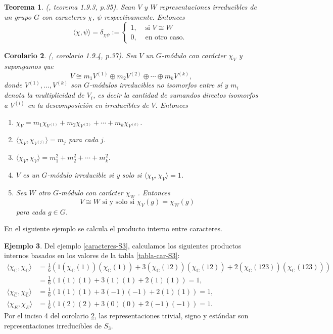 \documentclass[12pt]{book}
\newtheorem{theorem}{Teorema}[section]
\newtheorem{corollary}[theorem]{Corolario}
\theoremstyle{definition}
\newtheorem{example}[theorem]{Ejemplo}
\newcounter{in}
\begin{document}
\begin{theorem}{\normalfont (\cite{sagan2001symmetric}, teorema 1.9.3, p.35)}.
  \label{prod-car-irr}
  Sean $V$ y $W$ representaciones irreducibles de un grupo $G$ con
  caracteres $\chi$, $\psi$ respectivamente. Entonces
  \[
  \langle\chi,\psi\rangle=\delta_{\chi\psi}:=
  \begin{cases}
    1, & \text{ si }  V\cong W \\
    0, & \text{ en otro caso. } 
  \end{cases}
  \]
\end{theorem}
\begin{corollary}{\normalfont (\cite{sagan2001symmetric}, corolario 1.9.4, p.37)}.
  \label{multiplicidad}
  Sea $V$ un $G$-módulo con carácter $\chi_{V}$ y supongamos que 
  \begin{equation*}
    V\cong m_{1}V^{(1)}\oplus m_{2}V^{(2)}\oplus\cdots\oplus
    m_{k}V^{(k)},
  \end{equation*}
donde $V^{(1)},\ldots,V^{(k)}$ son $G$-módulos
irreducibles no isomorfos entre sí y $m_{i}$ denota la multiplicidad
de $V_{i}$, es
decir la cantidad de sumandos directos isomorfos a
$V^{(i)}$ en la descomposición en irreducibles de $V$. Entonces
\begin{enumerate}
\item $\chi_{V}=m_{1}\chi_{V^{(1)}}+m_{2}\chi_{V^{(2)}}+\cdots+m_{k}\chi_{V^{(k)}}$.
\item $\langle\chi_{V},\chi_{V^{(j)}}\rangle=m_{j}$ para cada $j$.
\item $\langle\chi_{V},\chi_{V}\rangle=m_{1}^{2}+m_{2}^{2}+\cdots+m_{k}^{2}$.
\item $V$ es un $G$-módulo irreducible si y solo si $\langle\chi_{V},\chi_{V}\rangle=1$.
\item Sea $W$ otro $G$-módulo con carácter $\chi_{W}$ . Entonces 
  $$V\cong W \mbox{ si y solo si } \chi_{V}(g)=\chi_{W}(g)$$
  para cada $g\in G$.
\end{enumerate}
\end{corollary}

En el siguiente ejemplo se calcula el producto interno entre caracteres.
\begin{example}
  \label{rep-triv-sig-est}
  Del ejemplo \ref{caracteres-S3}, calculamos los siguientes
  productos internos basados en los valores de la tabla \ref{tabla-car-S3}:
  \begin{align*}
    \langle\chi_{\mathbb{C}},\chi_{\mathbb{C}}\rangle&=\frac{1}{6}(1(\chi_{\mathbb{C}}(1))(\chi_{\mathbb{C}}(1))+3(\chi_{\mathbb{C}}(12))(\chi_{\mathbb{C}}(12))+2(\chi_{\mathbb{C}}(123))(\chi_{\mathbb{C}}(123)))\\
    &=\frac{1}{6}(1(1)(1)+3(1)(1)+2(1)(1))=1,  \\
    \langle\chi_{\widehat{\mathbb{C}}},\chi_{\widehat{\mathbb{C}}}\rangle&=\frac{1}{6}(1(1)(1)+3(-1)(-1)+2(1)(1))=1,  \\
    \langle\chi_{E},\chi_{E}\rangle&=\frac{1}{6}(1(2)(2)+3(0)(0)+2(-1)(-1))=1.
  \end{align*}
 Por el inciso 4 del corolario \ref{multiplicidad}, las representaciones trivial,
 signo y estándar son representaciones irreducibles de $S_{3}$.
\end{example}
\end{document}
